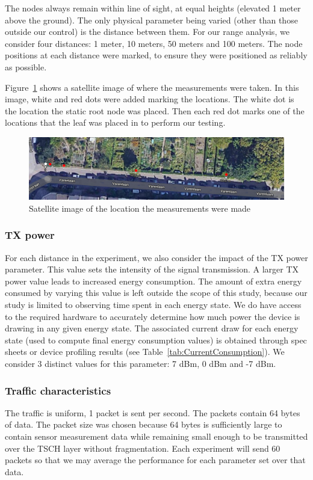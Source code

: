 \documentclass[conference]{IEEEtran}
\newcommand{\figref}[1]{Figure~\ref{#1}}
\newcommand{\tabref}[1]{Table~\ref{#1}}
\renewcommand\_{\textunderscore\allowbreak}
\begin{document}
The nodes always remain within line of sight, at equal heights (elevated 1 meter above the ground). The only physical parameter being varied (other than those outside our control) is the distance between them. For our range analysis, we consider four distances: 1 meter, 10 meters, 50 meters and 100 meters. The node positions at each distance were marked, to ensure they were positioned as reliably as possible.

\figref{fig:distance} shows a satellite image of where the measurements were taken. In this image, white and red dots were added marking the locations. The white dot is the location the static root node was placed. Then each red dot marks one of the locations that the leaf was placed in to perform our testing. 

\begin{figure}[htbp]
	\centering
	\includegraphics[width=.48\textwidth,keepaspectratio]{figures/distance}
	\caption{Satellite image of the location the measurements were made}
	\label{fig:distance}
\end{figure}

\subsubsection{TX power}
\label{section:txpower}

For each distance in the experiment, we also consider the impact of the TX power parameter. This value sets the intensity of the signal transmission. A larger TX power value leads to increased energy consumption\cite{AccurateEnergyTSCH}. The amount of extra energy consumed by varying this value is left outside the scope of this study, because our study is limited to observing time spent in each energy state. We do have access to the required hardware to accurately determine how much power the device is drawing in any given energy state. The associated current draw for each energy state (used to compute final energy consumption values) is obtained through spec sheets or device profiling results (see \tabref{tab:CurrentConsumption}). We consider 3 distinct values for this parameter: 7 dBm, 0 dBm and -7 dBm. 


\subsubsection{Traffic characteristics}
\label{section:trafficchar}
The traffic is uniform, 1 packet is sent per second. The packets contain 64 bytes of data. The packet size was chosen because 64 bytes is sufficiently large to contain sensor measurement data while remaining small enough to be transmitted over the TSCH layer without fragmentation. Each experiment will send 60 packets so that we may average the performance for each parameter set over that data. 
\end{document}
